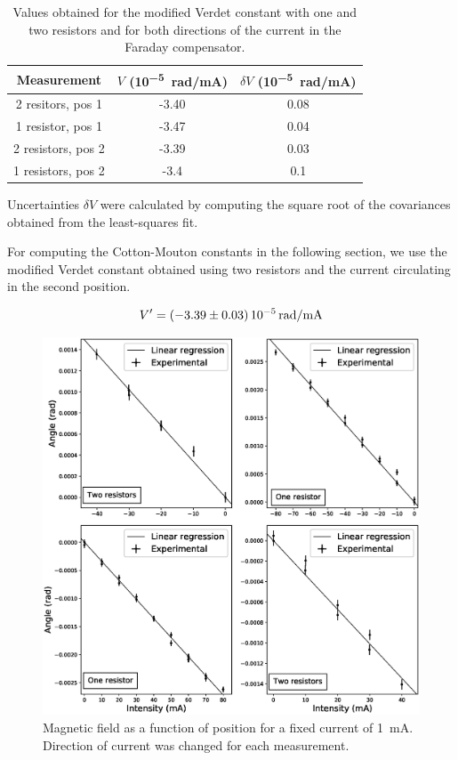 \documentclass[11pt,a4paper]{article}
\begin{document}
\begin{table}[H]
\centering
\begin{tabular}{ccc}
\toprule
Measurement & $V$ (\si{10^{-5}.\radian/\mA}) & $\delta V$ (\si{10^{-5}.\radian/\mA})\\
\midrule
2 resitors, pos 1 & -3.40 & 0.08 \\
1 resistor, pos 1 & -3.47 & 0.04 \\
2 resistors, pos 2 & -3.39 & 0.03 \\
1 resistors, pos 2 & -3.4 & 0.1 \\
\bottomrule
\end{tabular}
\caption{Values obtained for the modified Verdet constant with one and two resistors and for both directions of the current in the Faraday compensator.}
\label{table:verdet}
\end{table}

Uncertainties $\delta V$ were calculated by computing the square root of the covariances obtained from the least-squares fit.

For computing the Cotton-Mouton constants in the following section, we use the modified Verdet constant obtained using two resistors and the current circulating in the second position.

\begin{equation}
V'=\SI{-3.39\pm0.03}{\num{e-5}.\radian/\mA}
\end{equation}

\begin{figure}[H]
\centering
\includegraphics[width=\textwidth]{Angle_diff_intensity2.eps}
\caption{Magnetic field as a function of position for a fixed current of \SI{1}{\mA}. Direction of current was changed for each measurement.}
\label{fig:FaradayAngle}
\end{figure}
\end{document}

